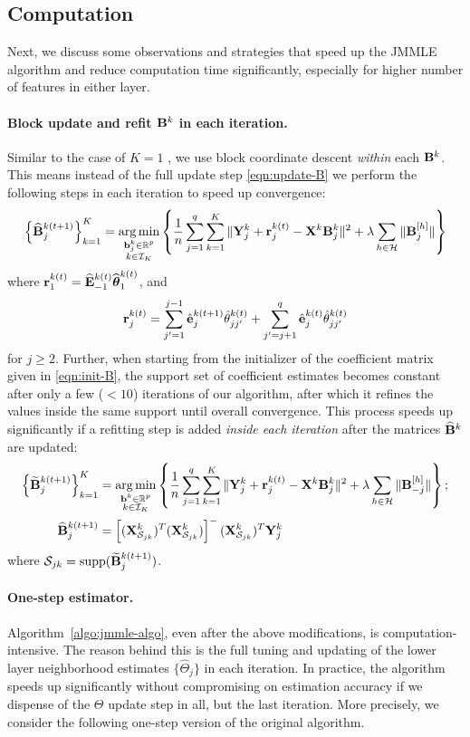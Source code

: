 \subsection{Computation}
\label{sec:tricks-jmmle}
Next, we discuss some observations and strategies that speed up the JMMLE algorithm and reduce computation time significantly, especially for higher number of features in either layer.

\paragraph{Block update and refit ${\mathbf{B}}^k$ in each iteration.} Similar to the case of $K=1$ \citep{LinEtal16}, we use block coordinate descent {\it within} each ${\mathbf{B}}^k$. This means instead of the full update step \eqref{eqn:update-B} we perform the following steps in each iteration to speed up convergence:
%
$$
\left\{\widehat {{\mathbf{B}}}^{k (t+1)}_j \right\}_{k=1}^K =
\operatorname*{arg\,min}_{\substack{{\bf{b}}_j^k \in {\mathbb{R}}^p\\k \in {\cal{I}}_K}} \left\{ \frac{1}{n} \sum_{j=1}^q \sum_{k=1}^K \| {\mathbf{Y}}^k_j + {\bf{r}}_j^{k (t)} - {\mathbf{X}}^k {\mathbf{B}}_j^{k } \|^2
+ \lambda \sum_{h \in {\cal{H}}} \| {\mathbf{B}}_j^{[h]} \| \right\}
$$
%
where ${\bf{r}}_1^{k (t)} = \widehat {{\mathbf{E}}}_{-1}^{k (t)} \widehat {{\boldsymbol{\theta}}}_1^{k (t)}$, and
%
$$
{\bf{r}}_j^{k (t)} = \sum_{j'=1}^{j-1} \hat {{\bf{e}}}_j^{k (t+1)} \hat \theta_{jj'}^{k (t)} +
\sum_{j'=j+1}^{q} \hat {{\bf{e}}}_j^{k (t)} \hat \theta_{jj'}^{k (t)}
$$
%
for $j \geq 2$. Further, when starting from the initializer of the coefficient matrix given in \eqref{eqn:init-B}, the support set of coefficient estimates becomes constant after only a few ($< 10$) iterations of our algorithm, after which it refines the values inside the same support until overall convergence. This process speeds up significantly if a refitting step is added {\it inside each iteration} after the matrices $\widehat {{\mathbf{B}}}^k$ are updated:
%
\begin{align*}
\left\{\widetilde {{\mathbf{B}}}^{k (t+1)}_j \right\}_{k=1}^K &=
\operatorname*{arg\,min}_{\substack{{\bf{b}}^k \in {\mathbb{R}}^p\\k \in {\cal{I}}_K}} \left\{ \frac{1}{n} \sum_{j=1}^q \sum_{k=1}^K \| {\mathbf{Y}}^k_j + {\bf{r}}_j^{k (t)} - {\mathbf{X}}^k {\mathbf{B}}_j^{k } \|^2
+ \lambda \sum_{h \in {\cal{H}}} \| {\mathbf{B}}^{[h]}_{-j} \| \right\}; \\
\widehat {{\mathbf{B}}}^{k (t+1)}_j &= \left[ ({\mathbf{X}}_{{\cal{S}}_{jk}}^k)^T ({\mathbf{X}}_{{\cal{S}}_{jk}}^k) \right]^- ({\mathbf{X}}_{{\cal{S}}_{jk}}^k)^T {\mathbf{Y}}_j^k
\end{align*}
%
where ${\cal{S}}_{jk} = \operatorname*{supp}(\widetilde {{\mathbf{B}}}^{k (t+1)}_j)$.

\paragraph{One-step estimator.} Algorithm~\ref{algo:jmmle-algo}, even after the above modifications, is computation-intensive. The reason behind this is the full tuning and updating of the lower layer neighborhood estimates $\{ \widehat \Theta_j \}$ in each iteration. In practice, the algorithm speeds up significantly without compromising on estimation accuracy if we dispense of the $\Theta$ update step in all, but the last iteration. More precisely, we consider the following one-step version of the original algorithm.

